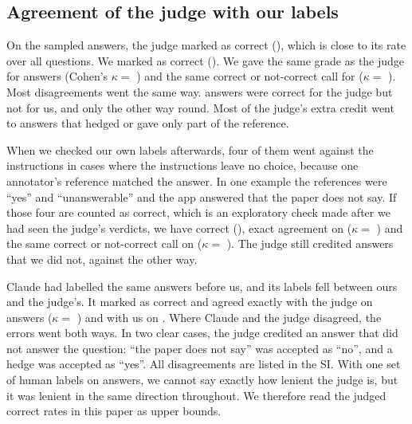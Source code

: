 \subsection{Agreement of the judge with our labels}
\label{sec:res-judge}

On the \JudgeCheckN{} sampled answers, the judge marked \JudgeCheckJudgeCorrect{} as correct
(\JudgeCheckJudgeRate{}), which is close to its rate over all questions. We marked
\JudgeCheckHumanCorrect{} as correct (\JudgeCheckHumanRate{}). We gave the same grade as the judge
for \JudgeCheckHumanExact{} answers (Cohen's $\kappa =$ \JudgeCheckHumanKappa{}) and the same
correct or not-correct call for \JudgeCheckHumanBinary{} ($\kappa =$
\JudgeCheckHumanKappaBinary{}). Most disagreements went the same way. \JudgeCheckHumanJudgeOnly{}
answers were correct for the judge but not for us, and only \JudgeCheckHumanHumanOnly{} the other
way round. Most of the judge's extra credit went to answers that hedged or gave only part of the
reference.

When we checked our own labels afterwards, four of them went against the instructions in cases
where the instructions leave no choice, because one annotator's reference matched the answer.
In one example the references were ``yes'' and ``unanswerable'' and the app answered that the
paper does not say. If those four are counted as correct, which is an exploratory check made
after we had seen the judge's verdicts, we have \JudgeCheckHumanRuleCorrect{} correct
(\JudgeCheckHumanRuleRate{}), exact agreement on \JudgeCheckHumanRuleExact{} ($\kappa =$
\JudgeCheckHumanRuleKappa{}) and the same correct or not-correct call on
\JudgeCheckHumanRuleBinary{} ($\kappa =$ \JudgeCheckHumanRuleKappaBinary{}). The judge still
credited \JudgeCheckHumanRuleJudgeOnly{} answers that we did not, against
\JudgeCheckHumanRuleHumanOnly{} the other way.

Claude had labelled the same answers before us, and its labels fell between ours and the judge's.
It marked \JudgeCheckClaudeCorrect{} as correct and agreed exactly with the judge on
\JudgeCheckExact{} answers ($\kappa =$ \JudgeCheckKappa{}) and with us on
\JudgeCheckHumanClaudeExact{}. Where Claude and the judge disagreed, the errors went both ways.
In two clear cases, the judge credited an answer that did not answer the question: ``the paper
does not say'' was accepted as ``no'', and a hedge was accepted as ``yes''. All disagreements are
listed in the SI. With one set of human labels on \JudgeCheckN{} answers, we cannot say exactly
how lenient the judge is, but it was lenient in the same direction throughout. We therefore read
the judged correct rates in this paper as upper bounds.

